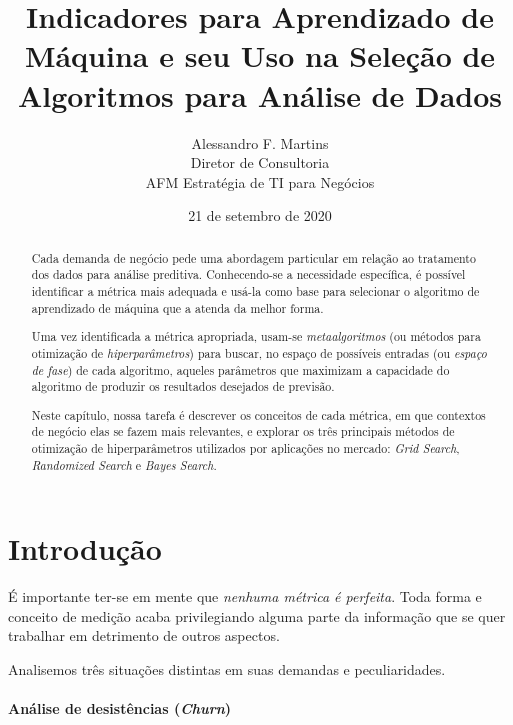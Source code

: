 \documentclass[]{article}
\date{}
\let\oldparagraph\paragraph
\renewcommand{\paragraph}[1]{\oldparagraph{#1}\mbox{}}
\begin{document}
\title{Indicadores para Aprendizado de Máquina e seu Uso na Seleção de Algoritmos para Análise de Dados}

\author{Alessandro F. Martins\\
Diretor de Consultoria\\
AFM Estratégia de TI para Negócios}

\date{21 de setembro de 2020}
\maketitle


\renewcommand{\abstractname}{Resumo}
\begin{abstract}

Cada demanda de negócio pede uma abordagem particular em relação ao
tratamento dos dados para análise preditiva. Conhecendo-se a necessidade
específica, é possível identificar a métrica mais adequada e usá-la como
base para selecionar o algoritmo de aprendizado de máquina que a atenda
da melhor forma.

Uma vez identificada a métrica apropriada, usam-se \emph{metaalgoritmos}
(ou métodos para otimização de \emph{hiperparâmetros}) para buscar, no
espaço de possíveis entradas (ou \emph{espaço de fase}) de cada
algoritmo, aqueles parâmetros que maximizam a capacidade do algoritmo de
produzir os resultados desejados de previsão.

Neste capítulo, nossa tarefa é descrever os conceitos de cada métrica,
em que contextos de negócio elas se fazem mais relevantes, e explorar os
três principais métodos de otimização de hiperparâmetros utilizados por
aplicações no mercado: \emph{Grid Search}, \emph{Randomized Search} e
\emph{Bayes Search}.

\end{abstract}

\hypertarget{header-n1070}{%
\section{Introdução}\label{header-n1070}}

É importante ter-se em mente que \emph{nenhuma métrica é perfeita}. Toda
forma e conceito de medição acaba privilegiando alguma parte da
informação que se quer trabalhar em detrimento de outros aspectos.

Analisemos três situações distintas em suas demandas e peculiaridades.

\hypertarget{header-n1074}{%
\paragraph{\texorpdfstring{Análise de desistências
(\emph{Churn})}{Análise de desistências (Churn)}}\label{header-n1074}}
\end{document}
